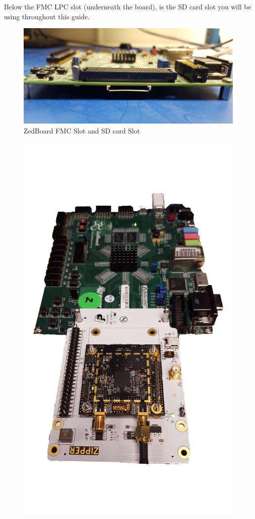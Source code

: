 \begin{flushleft}
Below the FMC LPC slot (underneath the board), is the SD card slot you will be using throughout this guide.
\begin{figure}[ht]
	\centerline{\includegraphics[scale=0.05]{zed_fmc_sd}}
	\caption{ZedBoard FMC Slot and SD card Slot}
	\label{fig:zed_fmc_sd}
\end{figure}
\begin{figure}[ht]
	\centerline{\includegraphics[scale=0.05]{zed_zipper}}

\end{figure}
\end{flushleft}

